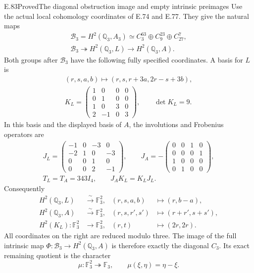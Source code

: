 \begin{statement}{E.83}{Proved}{The diagonal obstruction image and empty intrinsic preimages}
Use the actual local cohomology coordinates of
E.74 and E.77. They give the natural maps
\[
 \begin{gathered}
 \mathcal B_3=H^2(\mathbb Q_3,A_3)
       \simeq C_3^{63}\oplus C_9^{23}\oplus C_{27}^7,\\
 \mathcal B_3\twoheadrightarrow H^2(\mathbb Q_3,L)
       \longrightarrow H^2(\mathbb Q_3,A).
 \end{gathered}
 \tag{E83.3}
\]
Both groups after $\mathcal B_3$ have the following
fully specified coordinates. A basis for $L$ is
\[
 \begin{gathered}
 (r,s,a,b)\longmapsto
           (r,s,r+3a,2r-s+3b),\\
 K_L=\begin{pmatrix}
 1&0&0&0\\0&1&0&0\\1&0&3&0\\2&-1&0&3
 \end{pmatrix},\qquad \det K_L=9.
 \end{gathered}
 \tag{E83.4}
\]
In this basis and the displayed basis of $A$, the
involutions and Frobenius operators are
\[
 \begin{gathered}
 J_L=\begin{pmatrix}
 -1&0&-3&0\\-2&1&0&-3\\0&0&1&0\\0&0&2&-1
 \end{pmatrix},\qquad
 J_A=-\begin{pmatrix}
 0&0&1&0\\0&0&0&1\\1&0&0&0\\0&1&0&0
 \end{pmatrix},\\
 T_L=T_A=343I_4,\qquad J_AK_L=K_LJ_L.
 \end{gathered}
 \tag{E83.5}
\]
Consequently
\[
 \begin{aligned}
 H^2(\mathbb Q_3,L)&\xrightarrow{\ \sim\ }\mathbb F_3^2,
              &(r,s,a,b)&\longmapsto(r,b-a),\\
 H^2(\mathbb Q_3,A)&\xrightarrow{\ \sim\ }\mathbb F_3^2,
              &(r,s,r',s')&\longmapsto(r+r',s+s'),\\
 H^2(K_L):\mathbb F_3^2&\longrightarrow\mathbb F_3^2,
              &(r,t)&\longmapsto(2r,2r).
 \end{aligned}
 \tag{E83.6}
\]
All coordinates on the right are reduced modulo
three. The image of the full intrinsic map
$\Phi:\mathcal B_3\to H^2(\mathbb Q_3,A)$ is
therefore exactly the diagonal $C_3$. Its exact
remaining quotient is the character
\[
       \mu:\mathbb F_3^2\twoheadrightarrow\mathbb F_3,
                    \qquad \mu(\xi,\eta)=\eta-\xi.
 \tag{E83.7}
\]


\end{statement}

